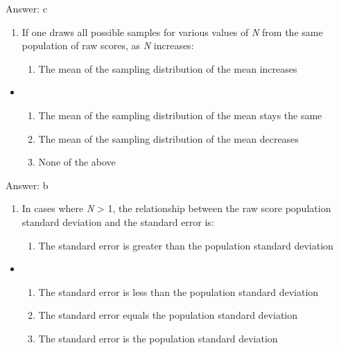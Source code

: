\documentclass[]{article}
\providecommand{\tightlist}{%
  \setlength{\itemsep}{0pt}\setlength{\parskip}{0pt}}
\begin{document}
Answer: c

\begin{enumerate}
\def\labelenumi{\arabic{enumi}.}
\setcounter{enumi}{10}
\item
  If one draws all possible samples for various values of \emph{N} from
  the same population of raw scores, as \emph{N} increases:

  \begin{enumerate}
  \def\labelenumii{\alph{enumii}.}
  \tightlist
  \item
    The mean of the sampling distribution of the mean increases
  \end{enumerate}
\end{enumerate}

\begin{itemize}
\item
  \begin{enumerate}
  \def\labelenumi{\alph{enumi}.}
  \setcounter{enumi}{1}
  \tightlist
  \item
    The mean of the sampling distribution of the mean stays the same
  \item
    The mean of the sampling distribution of the mean decreases
  \item
    None of the above
  \end{enumerate}
\end{itemize}

Answer: b

\begin{enumerate}
\def\labelenumi{\arabic{enumi}.}
\setcounter{enumi}{11}
\item
  In cases where \emph{N} \textgreater{} 1, the relationship between the
  raw score population standard deviation and the standard error is:

  \begin{enumerate}
  \def\labelenumii{\alph{enumii}.}
  \tightlist
  \item
    The standard error is greater than the population standard deviation
  \end{enumerate}
\end{enumerate}

\begin{itemize}
\item
  \begin{enumerate}
  \def\labelenumi{\alph{enumi}.}
  \setcounter{enumi}{1}
  \tightlist
  \item
    The standard error is less than the population standard deviation
  \item
    The standard error equals the population standard deviation
  \item
    The standard error is the population standard deviation
  \end{enumerate}
\end{itemize}
\end{document}
